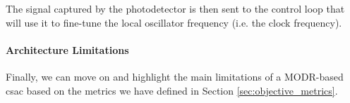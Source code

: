 The signal captured by the photodetector is then sent to the control loop that will use it to fine-tune the local oscillator frequency (i.e. the clock frequency).


\paragraph{Architecture Limitations}

Finally, we can move on and highlight the main limitations of a MODR-based \acrshort{csac} based on the metrics we have defined in Section \ref{sec:objective_metrics}.

